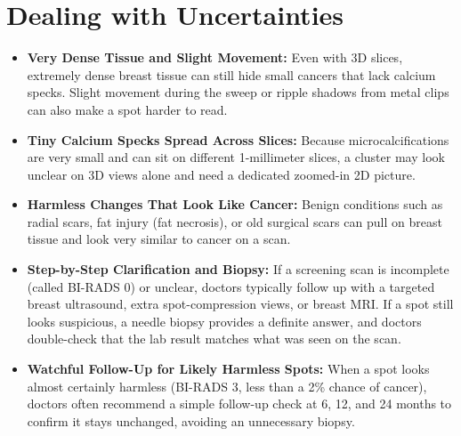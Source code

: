 \section{Dealing with Uncertainties}
\begin{itemize}
\item \textbf{Very Dense Tissue and Slight Movement:} Even with 3D slices, extremely dense breast tissue can still hide small cancers that lack calcium specks. Slight movement during the sweep or ripple shadows from metal clips can also make a spot harder to read.
\item \textbf{Tiny Calcium Specks Spread Across Slices:} Because microcalcifications are very small and can sit on different 1-millimeter slices, a cluster may look unclear on 3D views alone and need a dedicated zoomed-in 2D picture.
\item \textbf{Harmless Changes That Look Like Cancer:} Benign conditions such as radial scars, fat injury (fat necrosis), or old surgical scars can pull on breast tissue and look very similar to cancer on a scan.
\item \textbf{Step-by-Step Clarification and Biopsy:} If a screening scan is incomplete (called BI-RADS 0) or unclear, doctors typically follow up with a targeted breast ultrasound, extra spot-compression views, or breast MRI. If a spot still looks suspicious, a needle biopsy provides a definite answer, and doctors double-check that the lab result matches what was seen on the scan.
\item \textbf{Watchful Follow-Up for Likely Harmless Spots:} When a spot looks almost certainly harmless (BI-RADS 3, less than a 2\% chance of cancer), doctors often recommend a simple follow-up check at 6, 12, and 24 months to confirm it stays unchanged, avoiding an unnecessary biopsy.
\end{itemize}

